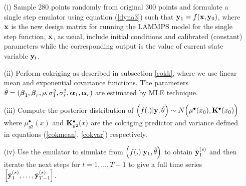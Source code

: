 \begin{itemize}
 \item[{(i)}] Sample 280 points randomly from original 300 points and formulate a single step emulator using equation (\ref{dyna3}) such that ${\bf y}_1=f({\bf x},{\bf y}_0)$, where ${\bf x}$ is the new design matrix for running the LAMMPS model for the single step function, ${\bf x}$, as usual, include initial conditions and calibrated (constant) parameters while the corresponding output is the value of current state variable ${\bf y}_t$.

\item[{(ii)}] Perform cokriging as described in subsection \ref{cokk}, where we use linear mean and exponential covariance functions. The parameters $\hat\theta=({\boldsymbol{\beta}}_1,{\boldsymbol{\beta}}_r,\rho,\sigma_1^2,\sigma_r^2,{\boldsymbol{\alpha}}_1,{\boldsymbol{\alpha}}_r)$ are estimated by MLE technique.

\item[{(iii)}] Compute the posterior distribution of $\Big(f(.)|{\bf y},\hat\theta \Big)\sim N \Big(\mu^{\bullet}(x_0), {\mathbf{K}}^{\bullet}(x_0)\Big)$ where $\mu_{y2}^{\bullet}(x)$ and ${\mathbf{K}}_{y2}^{\bullet}(x)$ are the cokriging predictor and variance defined in equations (\ref{cokmean}, \ref{cokvar}) respectively.

\item[{(iv)}] Use the emulator to simulate from $\Big(f(.)|{\bf y}_1,\hat\theta\Big)$  to obtain ${\tilde {\bf y}}^{(s)}_{1}$ and then iterate the next steps for $t=1,\ldots,T-1$ to give a full time series $\Big[{\tilde {\bf y}}^{(s)}_1,\ldots,{\tilde {\bf y}}^{(s)}_{T-1}\Big]$. 

\end{itemize}
